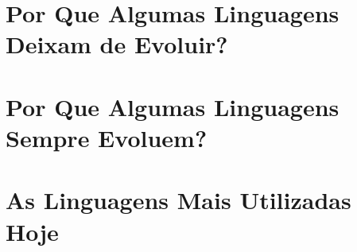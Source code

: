 \documentclass[
    12pt,               %
    openany,            %
    twoside,            %
    a4paper,            %
    brazil              %
    ]{abntex2}
\begin{document}
\part{Por Que Algumas Linguagens Deixam de Evoluir?}

\part{Por Que Algumas Linguagens Sempre Evoluem?}

\part{As Linguagens Mais Utilizadas Hoje}


\end{document}
